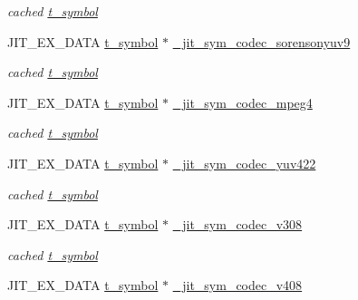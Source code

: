 \begin{DoxyCompactItemize}
\begin{DoxyCompactList}\small\item\em cached \hyperlink{structt__symbol}{t\_\-symbol} \item\end{DoxyCompactList}\item 
\hypertarget{group__jitter_ga4eb2fc38b9055d2a2554800dbb9fe834}{
JIT\_\-EX\_\-DATA \hyperlink{structt__symbol}{t\_\-symbol} $\ast$ \hyperlink{group__jitter_ga4eb2fc38b9055d2a2554800dbb9fe834}{\_\-jit\_\-sym\_\-codec\_\-sorensonyuv9}}
\label{group__jitter_ga4eb2fc38b9055d2a2554800dbb9fe834}

\begin{DoxyCompactList}\small\item\em cached \hyperlink{structt__symbol}{t\_\-symbol} \item\end{DoxyCompactList}\item 
\hypertarget{group__jitter_ga1f93e576c7a4d0c3c886b660dfb2ea2f}{
JIT\_\-EX\_\-DATA \hyperlink{structt__symbol}{t\_\-symbol} $\ast$ \hyperlink{group__jitter_ga1f93e576c7a4d0c3c886b660dfb2ea2f}{\_\-jit\_\-sym\_\-codec\_\-mpeg4}}
\label{group__jitter_ga1f93e576c7a4d0c3c886b660dfb2ea2f}

\begin{DoxyCompactList}\small\item\em cached \hyperlink{structt__symbol}{t\_\-symbol} \item\end{DoxyCompactList}\item 
\hypertarget{group__jitter_ga6f36294f085fb615ea778ce2f29291a8}{
JIT\_\-EX\_\-DATA \hyperlink{structt__symbol}{t\_\-symbol} $\ast$ \hyperlink{group__jitter_ga6f36294f085fb615ea778ce2f29291a8}{\_\-jit\_\-sym\_\-codec\_\-yuv422}}
\label{group__jitter_ga6f36294f085fb615ea778ce2f29291a8}

\begin{DoxyCompactList}\small\item\em cached \hyperlink{structt__symbol}{t\_\-symbol} \item\end{DoxyCompactList}\item 
\hypertarget{group__jitter_ga5157c67b8fec3fa55c3a695597ce4189}{
JIT\_\-EX\_\-DATA \hyperlink{structt__symbol}{t\_\-symbol} $\ast$ \hyperlink{group__jitter_ga5157c67b8fec3fa55c3a695597ce4189}{\_\-jit\_\-sym\_\-codec\_\-v308}}
\label{group__jitter_ga5157c67b8fec3fa55c3a695597ce4189}

\begin{DoxyCompactList}\small\item\em cached \hyperlink{structt__symbol}{t\_\-symbol} \item\end{DoxyCompactList}\item 
\hypertarget{group__jitter_ga994ce51291fde98e8bcd22a622763513}{
JIT\_\-EX\_\-DATA \hyperlink{structt__symbol}{t\_\-symbol} $\ast$ \hyperlink{group__jitter_ga994ce51291fde98e8bcd22a622763513}{\_\-jit\_\-sym\_\-codec\_\-v408}}
\label{group__jitter_ga994ce51291fde98e8bcd22a622763513}


\end{DoxyCompactItemize}
